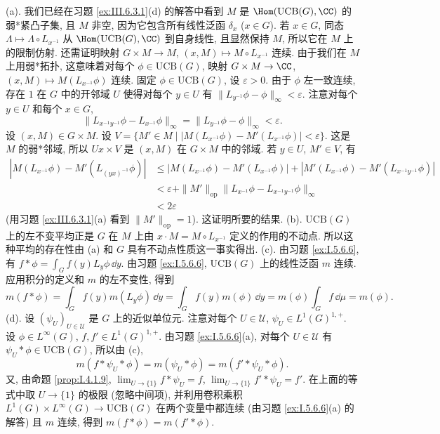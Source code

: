 \begin{solution}
(a). 我们已经在习题 \ref{ex:III.6.3.1}(d) 的解答中看到 $M$ 是 $\Hom(\mathrm{UCB}(G), \CC)$ 的弱*紧凸子集, 且 $M$ 非空, 因为它包含所有线性泛函 $\delta_x$ ($x \in G$).
若 $x \in G$, 同态 $\Lambda \longmapsto \Lambda \circ L_{x^{-1}}$ 从 $\Hom(\mathrm{UCB}(G), \CC)$ 到自身线性, 且显然保持 $M$, 所以它在 $M$ 上的限制仿射.
还需证明映射 $G \times M \to M$, $(x, M) \longmapsto M \circ L_{x^{-1}}$ 连续. 由于我们在 $M$ 上用弱*拓扑, 这意味着对每个 $\phi \in \mathrm{UCB}(G)$, 映射 $G \times M \to \CC$, $(x, M) \longmapsto M(L_{x^{-1}}\phi)$ 连续. 固定 $\phi \in \mathrm{UCB}(G)$, 设 $\varepsilon > 0$. 由于 $\phi$ 左一致连续, 存在 $1$ 在 $G$ 中的开邻域 $U$ 使得对每个 $y \in U$ 有 $\|L_{y^{-1}}\phi - \phi\|_{\infty} < \varepsilon$. 注意对每个 $y \in U$ 和每个 $x \in G$,
\[
\|L_{x^{-1}y^{-1}}\phi - L_{x^{-1}}\phi\|_{\infty} = \|L_{y^{-1}}\phi - \phi\|_{\infty} < \varepsilon.
\]
设 $(x, M) \in G \times M$. 设 $V = \{M' \in M \mid |M(L_{x^{-1}}\phi) - M'(L_{x^{-1}}\phi)| < \varepsilon\}$. 这是 $M$ 的弱*邻域, 所以 $Ux \times V$ 是 $(x, M)$ 在 $G \times M$ 中的邻域. 若 $y \in U$, $M' \in V$, 有
\begin{align*}
|M(L_{x^{-1}}\phi) - M'(L_{(yx)^{-1}}\phi)| &\leq |M(L_{x^{-1}}\phi) - M'(L_{x^{-1}}\phi)| + |M'(L_{x^{-1}}\phi) - M'(L_{x^{-1}y^{-1}}\phi)| \\
&< \varepsilon + \|M'\|_{\mathrm{op}}\|L_{x^{-1}}\phi - L_{x^{-1}y^{-1}}\phi\|_{\infty} \\
&< 2\varepsilon
\end{align*}
(用习题 \ref{ex:III.6.3.1}(a) 看到 $\|M'\|_{\mathrm{op}} = 1$). 这证明所要的结果.
(b). $\mathrm{UCB}(G)$ 上的左不变平均正是 $G$ 在 $M$ 上由 $x \cdot M = M \circ L_{x^{-1}}$ 定义的作用的不动点. 所以这种平均的存在性由 (a) 和 $G$ 具有不动点性质这一事实得出.
(c). 由习题 \ref{ex:I.5.6.6}, 有 $f * \phi = \int_G f(y)L_y\phi\,\dd y$. 由习题 \ref{ex:I.5.6.6}, $\mathrm{UCB}(G)$ 上的线性泛函 $m$ 连续. 应用积分的定义和 $m$ 的左不变性, 得到
\[
m(f * \phi) = \int_G f(y)m(L_y\phi)\,\dd y = \int_G f(y)m(\phi)\,\dd y = m(\phi)\int_G f\,\dd\mu = m(\phi).
\]
(d). 设 $(\psi_U)_{U \in \mathcal{U}}$ 是 $G$ 上的近似单位元. 注意对每个 $U \in \mathcal{U}$, $\psi_U \in L^1(G)^{1,+}$. 设 $\phi \in L^{\infty}(G)$, $f, f' \in L^1(G)^{1,+}$. 由习题 \ref{ex:I.5.6.6}(a), 对每个 $U \in \mathcal{U}$ 有 $\psi_U * \phi \in \mathrm{UCB}(G)$, 所以由 (c),
\[
m(f * \psi_U * \phi) = m(\psi_U * \phi) = m(f' * \psi_U * \phi).
\]
又, 由命题 \ref{prop:I.4.1.9}, $\lim_{U \to \{1\}}f * \psi_U = f$, $\lim_{U \to \{1\}}f' * \psi_U = f'$. 在上面的等式中取 $U \to \{1\}$ 的极限 (忽略中间项), 并利用卷积乘积 $L^1(G) \times L^{\infty}(G) \to \mathrm{UCB}(G)$ 在两个变量中都连续 (由习题 \ref{ex:I.5.6.6}(a) 的解答) 且 $m$ 连续, 得到 $m(f * \phi) = m(f' * \phi)$.

\end{solution}
